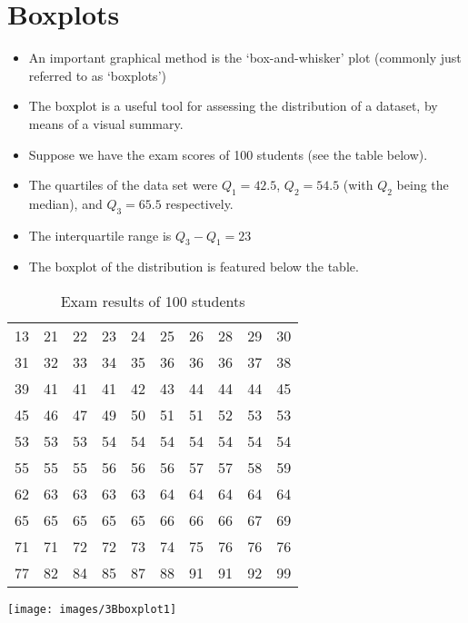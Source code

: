 \documentclass[a4paper,12pt]{article}
\begin{document}

{
\section*{Boxplots}
\begin{itemize}
\item An important graphical method is the `box-and-whisker' plot (commonly just referred to as `boxplots')
\item The boxplot is a useful tool for assessing the distribution of a dataset, by means of a visual summary.
\item Suppose we have the exam scores of 100 students (see the table below).
\item The quartiles of the data set were $Q_1 = 42.5$, $Q_2 = 54.5$ (with $Q_2$ being the median), and $Q_3 =  65.5$ respectively.
\item The interquartile range is $Q_3 - Q_1 = 23$
\item The boxplot of the distribution is featured below the table.
\end{itemize}

\begin{table}[ht]
\caption{Exam results of 100 students} %
\centering %
\begin{tabular}{|c ccc ccc ccc|} %
\hline

13&21&22&23&24&25&26&28&29&30\\31&32&33&34&35& 36&36&36&37&38\\
39&41&41&41&42&43&44&44&44&45\\45&46&47&49&50& 51&51&52&53&53\\
53&53&53&54&54&54&54&54&54&54\\55&55&55&56&56& 56&57&57&58&59\\
62&63&63&63&63&64&64&64&64&64\\65&65&65&65&65& 66&66&66&67&69\\
71&71&72&72&73&74&75&76&76&76\\77&82&84&85&87& 88&91&91&92&99\\ \hline
\end{tabular}
\end{table}


\begin{center}
\texttt{[image: images/3Bboxplot1]}
\end{center}

}
\end{document}
